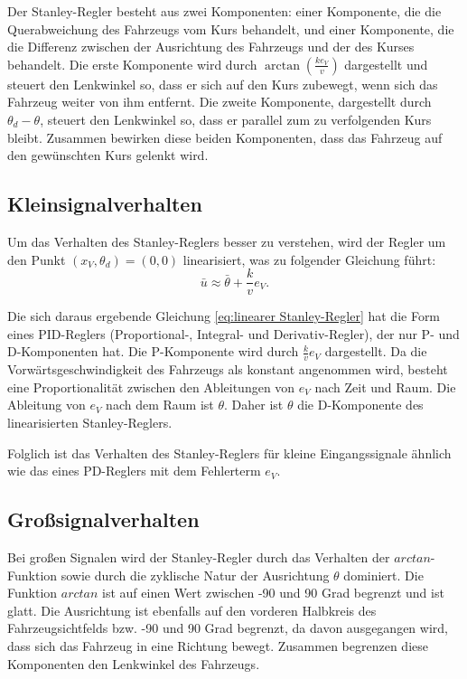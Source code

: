 \documentclass[arbeit=studie,oneside,BCOR=12mm]{ArbeitRST}
\begin{document}
Der Stanley-Regler besteht aus zwei Komponenten: einer Komponente, die die
Querabweichung des Fahrzeugs vom Kurs behandelt, und einer Komponente, die die
Differenz zwischen der Ausrichtung des Fahrzeugs und der des Kurses behandelt.
Die erste Komponente wird durch $\arctan(\frac{ke_{V}}{v})$ dargestellt und
steuert den Lenkwinkel so, dass er sich auf den Kurs zubewegt, wenn sich das
Fahrzeug weiter von ihm entfernt. Die zweite Komponente, dargestellt durch
$\theta_d - \theta$, steuert den Lenkwinkel so, dass er parallel zum zu
verfolgenden Kurs bleibt. Zusammen bewirken diese beiden Komponenten, dass
das Fahrzeug auf den gewünschten Kurs gelenkt wird.


\subsection{Kleinsignalverhalten}


Um das Verhalten des Stanley-Reglers besser zu verstehen, wird der Regler um
den Punkt $\left(x_V, \theta_d\right) = \left(0, 0\right)$
linearisiert, was zu folgender Gleichung führt: 
\begin{equation} \bar{u} \approx \bar{\theta} + \frac{k}{v}e_{V}. 
    \label{eq:linearer Stanley-Regler}
\end{equation}

Die sich daraus ergebende Gleichung \eqref{eq:linearer Stanley-Regler} hat die
Form eines PID-Reglers (Proportional-, Integral- und Derivativ-Regler), der nur
P- und D-Komponenten hat. Die P-Komponente wird durch \(\frac{k}{v}e_{V}\)
dargestellt. Da die Vorwärtsgeschwindigkeit des Fahrzeugs als konstant
angenommen wird, besteht eine Proportionalität zwischen den Ableitungen von
\(e_{V}\) nach Zeit und Raum. Die Ableitung von \(e_{V}\) nach dem Raum ist
\(\theta\). Daher ist \(\theta\) die D-Komponente des linearisierten
Stanley-Reglers.

Folglich ist das Verhalten des Stanley-Reglers für kleine Eingangssignale
ähnlich wie das eines PD-Reglers mit dem Fehlerterm \(e_{V}\). 


\subsection{Gro{\ss}signalverhalten}

Bei großen Signalen wird der Stanley-Regler durch das Verhalten der
\(arctan\)-Funktion sowie durch die zyklische Natur der Ausrichtung
\(\theta\) dominiert. Die Funktion \(arctan\) ist auf einen Wert zwischen
-90 und 90 Grad begrenzt und ist glatt. Die Ausrichtung ist ebenfalls auf den
vorderen Halbkreis des Fahrzeugsichtfelds bzw. -90 und 90 Grad begrenzt, da davon ausgegangen wird,
dass sich das Fahrzeug in eine Richtung bewegt. Zusammen begrenzen diese
Komponenten den Lenkwinkel des Fahrzeugs.
\end{document}
